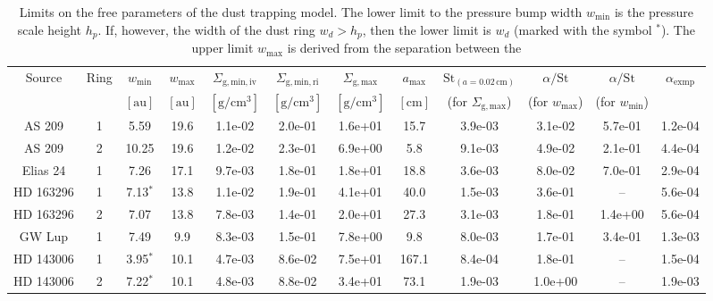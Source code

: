 \documentclass{aa}
\begin{document}
\begin{table*}
\begin{center}
\begin{tabular}{|cc|ccccccc|ccc|}
\hline
\hline
Source     & Ring & $w_{\mathrm{min}}$ & $w_{\mathrm{max}}$ & $\Sigma_{\mathrm{g,min,iv}}$ & $\Sigma_{\mathrm{g,min,ri}}$ & $\Sigma_{\mathrm{g,max}}$ & $a_{\mathrm{max}}$ & $\mathrm{St}_{(a=0.02\,\mathrm{cm})}$ & $\alpha/\mathrm{St}$ & $\alpha/\mathrm{St}$ & $\alpha_{\mathrm{exmp}}$\\
           &      & $[\mathrm{au}]$  & $[\mathrm{au}]$  & $[\mathrm{g}/\mathrm{cm}^3]$ & $[\mathrm{g}/\mathrm{cm}^3]$ & $[\mathrm{g}/\mathrm{cm}^3]$ & $[\mathrm{cm}]$ & (for $\Sigma_{\mathrm{g,max}}$)& (for $w_\mathrm{max}$) & (for $w_\mathrm{min}$) &   \\
\hline
AS 209     & 1 &  5.59 & 19.6 & 1.1e-02 & 2.0e-01 & 1.6e+01 & 15.7 & 3.9e-03 & 3.1e-02 & 5.7e-01 & 1.2e-04\\
AS 209     & 2 & 10.25 & 19.6 & 1.2e-02 & 2.3e-01 & 6.9e+00 &  5.8 & 9.1e-03 & 4.9e-02 & 2.1e-01 & 4.4e-04\\
Elias 24   & 1 &  7.26 & 17.1 & 9.7e-03 & 1.8e-01 & 1.8e+01 & 18.8 & 3.6e-03 & 8.0e-02 & 7.0e-01 & 2.9e-04\\
HD 163296  & 1 &  7.13$^{*}$ & 13.8 & 1.1e-02 & 1.9e-01 & 4.1e+01 & 40.0 & 1.5e-03 & 3.6e-01 & -- & 5.6e-04\\
HD 163296  & 2 &  7.07 & 13.8 & 7.8e-03 & 1.4e-01 & 2.0e+01 & 27.3 & 3.1e-03 & 1.8e-01 & 1.4e+00 & 5.6e-04\\
GW Lup     & 1 &  7.49 &  9.9 & 8.3e-03 & 1.5e-01 & 7.8e+00 &  9.8 & 8.0e-03 & 1.7e-01 & 3.4e-01 & 1.3e-03\\
HD 143006  & 1 &  3.95$^{*}$ & 10.1 & 4.7e-03 & 8.6e-02 & 7.5e+01 & 167.1 & 8.4e-04 & 1.8e-01 & -- & 1.5e-04\\
HD 143006  & 2 &  7.22$^{*}$ & 10.1 & 4.8e-03 & 8.8e-02 & 3.4e+01 & 73.1 & 1.9e-03 & 1.0e+00 & -- & 1.9e-03\\
\hline
\hline
\end{tabular}
\end{center}
\caption{\label{tab-ring-model-limits}Limits on the free parameters of the dust
  trapping model. The lower limit to the pressure bump width $w_{\mathrm{min}}$
  is the pressure scale height $h_p$. If, however, the width of the dust ring
  $w_d>h_p$, then the lower limit is $w_d$ (marked with the symbol $^{*}$).  The
  upper limit $w_{\mathrm{max}}$ is derived from the separation between the
}
\end{table*}
\end{document}
